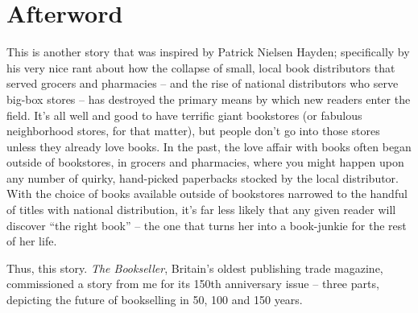 \section{Afterword}

This is another story that was inspired by Patrick Nielsen Hayden; 
specifically by his very nice rant about how the collapse of small, 
local book distributors that served grocers and pharmacies -- and the 
rise of national distributors who serve big-box stores -- has destroyed 
the primary means by which new readers enter the field. It's all well 
and good to have terrific giant bookstores (or fabulous neighborhood 
stores, for that matter), but people don't go into those stores unless 
they already love books. In the past, the love affair with books often 
began outside of bookstores, in grocers and pharmacies, where you might 
happen upon any number of quirky, hand-picked paperbacks stocked by the 
local distributor. With the choice of books available outside of 
bookstores narrowed to the handful of titles with national 
distribution, it's far less likely that any given reader will discover 
“the right book” -- the one that turns her into a book-junkie for 
the rest of her life.

Thus, this story. \emph{The Bookseller}, Britain's oldest publishing 
trade magazine, commissioned a story from me for its 150th anniversary 
issue -- three parts, depicting the future of bookselling in 50, 100 
and 150 years.


